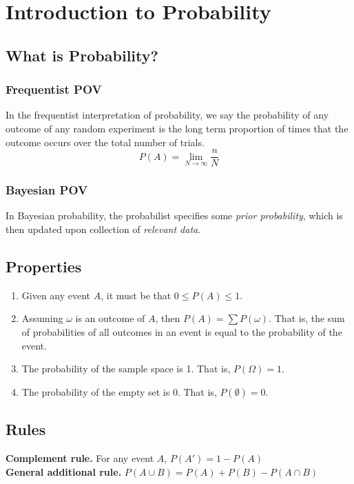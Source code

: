 \section{Introduction to Probability}  %
\subsection{What is Probability?}  %
\subsubsection{Frequentist POV}  %
In the frequentist interpretation of probability, we say the probability of any outcome of any random experiment is the long term proportion of times that the outcome occurs over the total number of trials.
\begin{equation}
    P(A)=\lim_{N\to\infty}\frac{n}{N}
\end{equation}

\subsubsection{Bayesian POV}  %
In Bayesian probability, the probabilist specifies some \emph{prior probability}, which is then updated upon collection of \emph{relevant data}.

\subsection{Properties}  %
\begin{enumerate}
    \item Given any event $A$, it must be that $0\leq P(A) \leq 1$.
    \item Assuming $\omega$ is an outcome of $A$, then $P(A)=\sum P(\omega)$. That is, the sum of probabilities of all outcomes in an event is equal to the probability of the event.
    \item The probability of the sample space is 1. That is, $P(\Omega)=1$.
    \item The probability of the empty set is 0. That is, $P(\emptyset)=0$.
\end{enumerate}

\subsection{Rules}  %
\textbf{Complement rule. } For any event $A$, $P(A')=1-P(A)$ \\
\textbf{General additional rule. } $P(A\cup B)= P(A)+P(B)-P(A\cap B)$ \\

